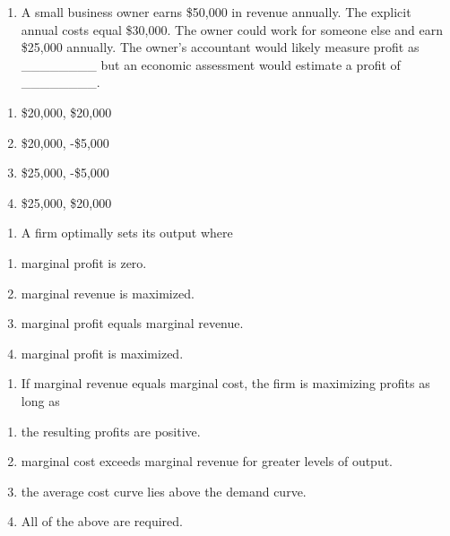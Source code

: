 \documentclass[11pt,]{article}
\providecommand{\tightlist}{%
  \setlength{\itemsep}{0pt}\setlength{\parskip}{0pt}}
\begin{document}
\begin{enumerate}
\def\labelenumi{\arabic{enumi})}
\setcounter{enumi}{2}
\tightlist
\item
  A small business owner earns \$50,000 in revenue annually. The
  explicit annual costs equal \$30,000. The owner could work for someone
  else and earn \$25,000 annually. The owner's accountant would likely
  measure profit as \_\_\_\_\_\_\_\_ but an economic assessment would
  estimate a profit of \_\_\_\_\_\_\_\_.
\end{enumerate}

\begin{enumerate}
\def\labelenumi{\Alph{enumi})}
\tightlist
\item
  \$20,000, \$20,000
\item
  \$20,000, -\$5,000
\item
  \$25,000, -\$5,000
\item
  \$25,000, \$20,000
\end{enumerate}

\begin{enumerate}
\def\labelenumi{\arabic{enumi})}
\setcounter{enumi}{3}
\tightlist
\item
  A firm optimally sets its output where
\end{enumerate}

\begin{enumerate}
\def\labelenumi{\Alph{enumi})}
\tightlist
\item
  marginal profit is zero.
\item
  marginal revenue is maximized.
\item
  marginal profit equals marginal revenue.
\item
  marginal profit is maximized.
\end{enumerate}

\begin{enumerate}
\def\labelenumi{\arabic{enumi})}
\setcounter{enumi}{4}
\tightlist
\item
  If marginal revenue equals marginal cost, the firm is maximizing
  profits as long as
\end{enumerate}

\begin{enumerate}
\def\labelenumi{\Alph{enumi})}
\tightlist
\item
  the resulting profits are positive.
\item
  marginal cost exceeds marginal revenue for greater levels of output.
\item
  the average cost curve lies above the demand curve.
\item
  All of the above are required.
\end{enumerate}
\end{document}
